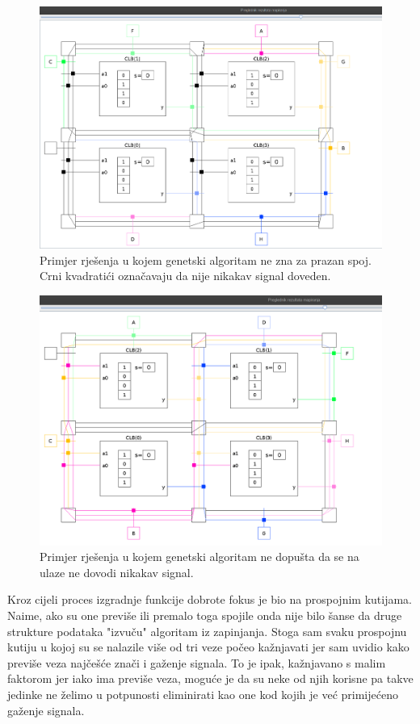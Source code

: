 \documentclass[times, utf8, zavrsni]{fer}
\begin{document}
\begin{figure}[H]
	\centering
	\includegraphics[width=18cm]{slike/blackLabel.png}
	\caption{Primjer rješenja u kojem genetski algoritam ne zna za prazan spoj. Crni kvadratići označavaju da nije nikakav signal doveden. }
	\label{fig:black-label}
\end{figure} 



\begin{figure}[H]
	\centering
	\includegraphics[width=18cm]{slike/withoutBlackLabel.png}
	\caption{Primjer rješenja u kojem genetski algoritam ne dopušta da se na ulaze ne dovodi nikakav signal.}
	\label{fig:black-label}
\end{figure} 


Kroz cijeli proces izgradnje funkcije dobrote fokus je bio na prospojnim kutijama. Naime, ako su one previše ili premalo toga spojile onda nije bilo šanse da druge strukture podataka "izvuču" algoritam iz zapinjanja. Stoga sam svaku prospojnu kutiju u kojoj su se nalazile više od tri veze počeo kažnjavati jer sam uvidio kako previše veza najčešće znači i gaženje signala. To je ipak, kažnjavano s malim faktorom jer iako ima previše veza, moguće je da su neke od njih korisne pa takve jedinke ne želimo u potpunosti eliminirati kao one kod kojih je već primijećeno gaženje signala. 
\end{document}
